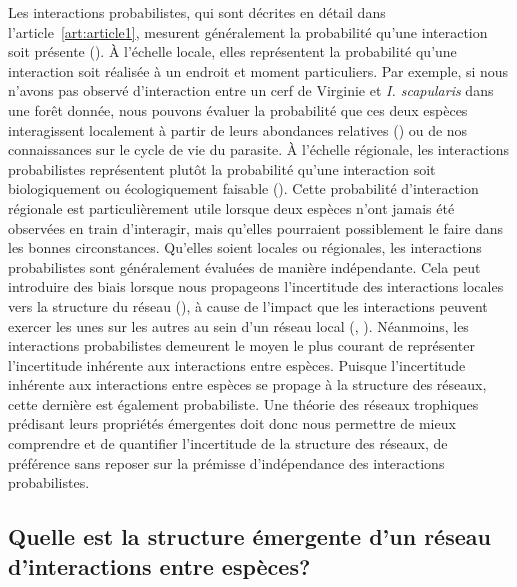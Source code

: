 Les interactions probabilistes, qui sont décrites en détail dans
l'article~\ref{art:article1}, mesurent généralement la probabilité qu'une
interaction soit présente (\cite{Poisot2016Structure}). À l'échelle locale,
elles représentent la probabilité qu'une interaction soit réalisée à un endroit
et moment particuliers. Par exemple, si nous n'avons pas observé d'interaction
entre un cerf de Virginie et \textit{I. scapularis} dans une forêt donnée, nous
pouvons évaluer la probabilité que ces deux espèces interagissent localement à
partir de leurs abondances relatives (\cite{Canard2014Empirical}) ou de nos
connaissances sur le cycle de vie du parasite. À l'échelle régionale, les
interactions probabilistes représentent plutôt la probabilité qu'une interaction
soit biologiquement ou écologiquement faisable (\cite{Strydom2023Grapha}). Cette
probabilité d'interaction régionale est particulièrement utile lorsque deux
espèces n'ont jamais été observées en train d'interagir, mais qu'elles
pourraient possiblement le faire dans les bonnes circonstances. Qu'elles soient
locales ou régionales, les interactions probabilistes sont généralement évaluées
de manière indépendante. Cela peut introduire des biais lorsque nous propageons
l'incertitude des interactions locales vers la structure du réseau
(\cite{Poisot2016Structure}), à cause de l'impact que les interactions peuvent
exercer les unes sur les autres au sein d'un réseau local
(\cite{Golubski2011Modifying}, \cite{Ims2013Indirect}). Néanmoins, les
interactions probabilistes demeurent le moyen le plus courant de représenter
l'incertitude inhérente aux interactions entre espèces. Puisque l'incertitude
inhérente aux interactions entre espèces se propage à la structure des réseaux,
cette dernière est également probabiliste. Une théorie des réseaux trophiques
prédisant leurs propriétés émergentes doit donc nous permettre de mieux
comprendre et de quantifier l'incertitude de la structure des réseaux, de
préférence sans reposer sur la prémisse d'indépendance des interactions
probabilistes.


\subsection{Quelle est la structure émergente d'un réseau d'interactions entre espèces?} 

